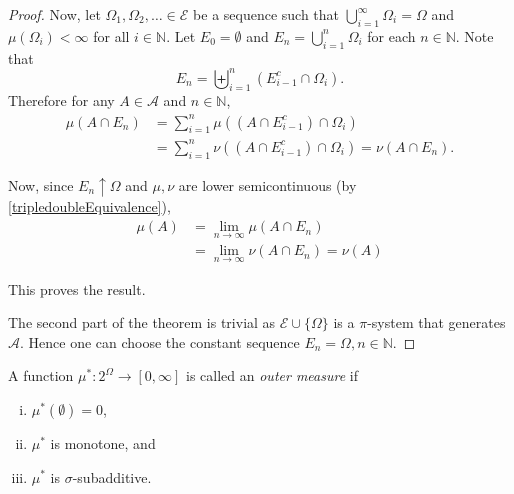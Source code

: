 \begin{proof}
    Now, let $\Omega_1,\Omega_2,\ldots\in\mathcal{E}$ be a sequence such that $\bigcup_{i=1}^\infty\Omega_i=\Omega$ and $\mu(\Omega_i)<\infty$ for all $i\in\mathbb{N}$. Let $E_0=\emptyset$ and $E_n=\bigcup_{i=1}^n\Omega_i$ for each $n\in\mathbb{N}$. Note that
    $$E_n=\biguplus_{i=1}^n(E_{i-1}^c\cap \Omega_i).$$
    Therefore for any $A\in\mathcal{A}$ and $n\in\mathbb{N}$,
    \begin{align*}
        \mu(A\cap E_n) &= \sum_{i=1}^n\mu((A\cap E_{i-1}^c)\cap\Omega_i) \\
        &= \sum_{i=1}^n\nu((A\cap E_{i-1}^c)\cap\Omega_i) = \nu(A\cap E_n).
    \end{align*}
    
    Now, since $E_n\uparrow\Omega$ and $\mu,\nu$ are lower semicontinuous (by \cref{tripledoubleEquivalence}),
    \begin{align*}
        \mu(A) &= \lim_{n\to\infty}\mu(A\cap E_n) \\
        &= \lim_{n\to\infty}\nu(A\cap E_n) = \nu(A)
    \end{align*}
    
    This proves the result.
    
    \vspace{2mm}
    The second part of the theorem is trivial as $\mathcal{E}\cup\{\Omega\}$ is a $\pi$-system that generates $\mathcal{A}$. Hence one can choose the constant sequence $E_n=\Omega, n\in\mathbb{N}$.
\end{proof}

\begin{definition}
    A function $\mu^*:2^\Omega\to[0,\infty]$ is called an \textit{outer measure} if
    \begin{enumerate}[(i)]
        \item $\mu^*(\emptyset)=0$,
        \item $\mu^*$ is monotone, and
        \item $\mu^*$ is $\sigma$-subadditive.
    \end{enumerate}
\end{definition}

